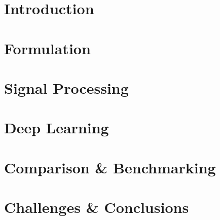 \documentclass[harvard]{lincolncsuthesis}
\begin{document}
\maketitle

%






\thesisTables

\thesisBodyStart

\chapter{Introduction}


% 

\chapter{Formulation}


\chapter{Signal Processing}


\chapter{Deep Learning}


\chapter{Comparison & Benchmarking}


\chapter{Challenges & Conclusions}

\end{document}
